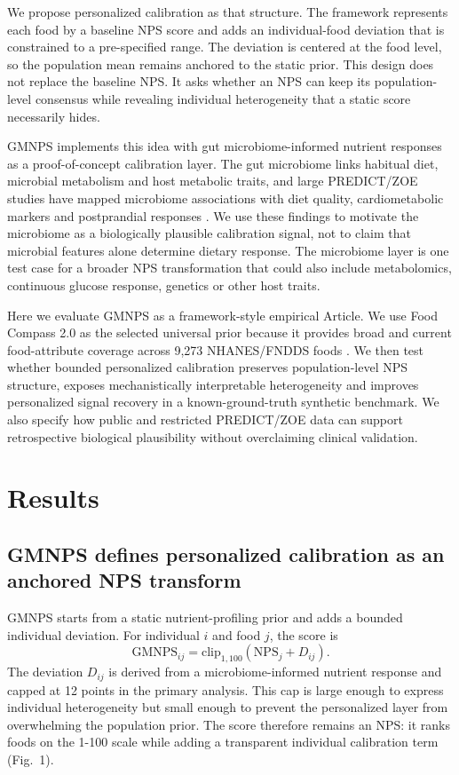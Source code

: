 We propose personalized calibration as that structure. The framework represents
each food by a baseline NPS score and adds an individual-food deviation that is
constrained to a pre-specified range. The deviation is centered at the food
level, so the population mean remains anchored to the static prior. This design
does not replace the baseline NPS. It asks whether an NPS can keep its
population-level consensus while revealing individual heterogeneity that a
static score necessarily hides.

GMNPS implements this idea with gut microbiome-informed nutrient responses as a
proof-of-concept calibration layer. The gut microbiome links habitual diet,
microbial metabolism and host metabolic traits, and large PREDICT/ZOE studies
have mapped microbiome associations with diet quality, cardiometabolic markers
and postprandial responses
\cite{asnicar2021microbiome,asnicar2025gut}. We use these findings to motivate
the microbiome as a biologically plausible calibration signal, not to claim that
microbial features alone determine dietary response. The microbiome layer is
one test case for a broader NPS transformation that could also include
metabolomics, continuous glucose response, genetics or other host traits.

Here we evaluate GMNPS as a framework-style empirical Article. We use Food
Compass 2.0 as the selected universal prior because it provides broad and
current food-attribute coverage across 9,273 NHANES/FNDDS foods
\cite{barrett2024foodcompass2}. We then test whether bounded personalized
calibration preserves population-level NPS structure, exposes mechanistically
interpretable heterogeneity and improves personalized signal recovery in a
known-ground-truth synthetic benchmark. We also specify how public and
restricted PREDICT/ZOE data can support retrospective biological plausibility
without overclaiming clinical validation.

\section*{Results}

\subsection*{GMNPS defines personalized calibration as an anchored NPS transform}

GMNPS starts from a static nutrient-profiling prior and adds a bounded
individual deviation. For individual \(i\) and food \(j\), the score is
\[
  \mathrm{GMNPS}_{ij} = \mathrm{clip}_{1,100}\left(\mathrm{NPS}_{j} + D_{ij}\right).
\]
The deviation \(D_{ij}\) is derived from a microbiome-informed nutrient response
and capped at 12 points in the primary analysis. This cap is large enough to
express individual heterogeneity but small enough to prevent the personalized
layer from overwhelming the population prior. The score therefore remains an
NPS: it ranks foods on the 1-100 scale while adding a transparent individual
calibration term (Fig.~1).

